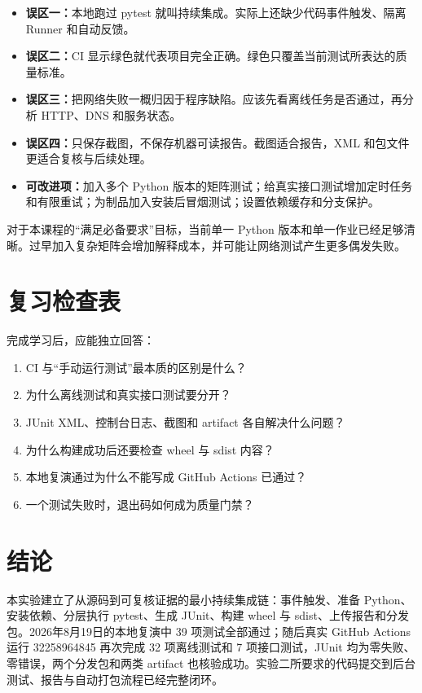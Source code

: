 \documentclass[UTF8,zihao=-4,a4paper]{ctexart}
\newcommand{\term}[1]{\textbf{#1}}
\newcommand{\risk}[1]{\textcolor{CodeRed}{\textbf{#1}}}
\begin{document}
\begin{itemize}
  \item \risk{误区一：}本地跑过 pytest 就叫持续集成。实际上还缺少代码事件触发、隔离 Runner 和自动反馈。
  \item \risk{误区二：}CI 显示绿色就代表项目完全正确。绿色只覆盖当前测试所表达的质量标准。
  \item \risk{误区三：}把网络失败一概归因于程序缺陷。应该先看离线任务是否通过，再分析 HTTP、DNS 和服务状态。
  \item \risk{误区四：}只保存截图，不保存机器可读报告。截图适合报告，XML 和包文件更适合复核与后续处理。
  \item \term{可改进项：}加入多个 Python 版本的矩阵测试；给真实接口测试增加定时任务和有限重试；为制品加入安装后冒烟测试；设置依赖缓存和分支保护。
\end{itemize}

对于本课程的“满足必备要求”目标，当前单一 Python 版本和单一作业已经足够清晰。过早加入复杂矩阵会增加解释成本，并可能让网络测试产生更多偶发失败。

\section{复习检查表}

完成学习后，应能独立回答：

\begin{enumerate}
  \item CI 与“手动运行测试”最本质的区别是什么？
  \item 为什么离线测试和真实接口测试要分开？
  \item JUnit XML、控制台日志、截图和 artifact 各自解决什么问题？
  \item 为什么构建成功后还要检查 wheel 与 sdist 内容？
  \item 本地复演通过为什么不能写成 GitHub Actions 已通过？
  \item 一个测试失败时，退出码如何成为质量门禁？
\end{enumerate}

\section{结论}

本实验建立了从源码到可复核证据的最小持续集成链：事件触发、准备 Python、安装依赖、分层执行 pytest、生成 JUnit、构建 wheel 与 sdist、上传报告和分发包。2026年8月19日的本地复演中 39 项测试全部通过；随后真实 GitHub Actions 运行 32258964845 再次完成 32 项离线测试和 7 项接口测试，JUnit 均为零失败、零错误，两个分发包和两类 artifact 也核验成功。实验二所要求的代码提交到后台测试、报告与自动打包流程已经完整闭环。
\end{document}
